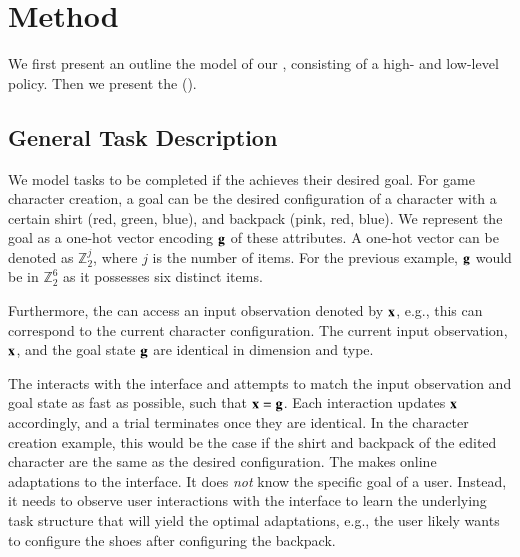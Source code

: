 
\section{Method}
We first present an outline the model of our \useragent, consisting of a high- and low-level policy. Then we present the \interfaceagent ().

\subsection{General Task Description}
We model tasks to be completed if the \useragent achieves their desired goal. For game character creation, a goal can be the desired configuration of a character with a certain shirt (red, green, blue), and backpack (pink, red, blue). We represent the goal as a one-hot vector encoding $\mathbf{g}$ of these attributes. A one-hot vector can be denoted as  $\mathbb{Z}_{2}^{j}$, where $j$ is the number of items. For the previous example, $\mathbf{g}$ would be in $\mathbb{Z}_2^6$ as it possesses six distinct items. 

Furthermore, the \useragent can access an input observation denoted by $\mathbf{x}$, e.g., this can correspond to the current character configuration. The current input observation, $\mathbf{x}$, and the goal state $\mathbf{g}$ are identical in dimension and type. 

The \useragent interacts with the interface and attempts to match the input observation and goal state as fast as possible, such that $\mathbf{x} = \mathbf{g}$. Each interaction updates $\mathbf{x}$ accordingly, and a trial terminates once they are identical. In the character creation example, this would be the case if the shirt and backpack of the edited character are the same as the desired configuration. The \interfaceagent makes online adaptations to the interface. It does \emph{not} know the specific goal of a user. Instead, it needs to observe user interactions with the interface to learn the underlying task structure that will yield the optimal adaptations, e.g., the user likely wants to configure the shoes after configuring the backpack.


